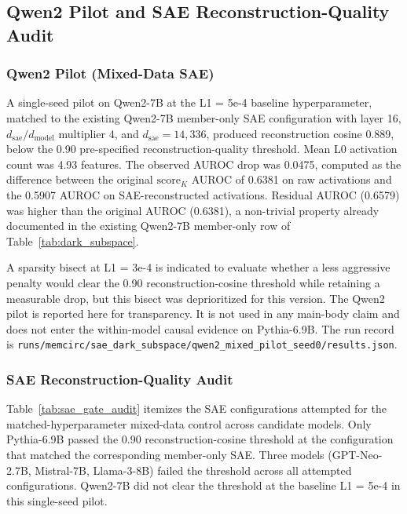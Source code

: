 \FloatBarrier

\subsection{Qwen2 Pilot and SAE Reconstruction-Quality Audit}
\label{app:qwen2_pilot}

\subsubsection{Qwen2 Pilot (Mixed-Data SAE)}

A single-seed pilot on Qwen2-7B at the L1 = 5e-4 baseline hyperparameter, matched to the existing Qwen2-7B member-only SAE configuration with layer 16, $d_{\text{sae}}/d_{\text{model}}$ multiplier 4, and $d_{\text{sae}} = 14{,}336$, produced reconstruction cosine 0.889, below the 0.90 pre-specified reconstruction-quality threshold.
Mean L0 activation count was 4.93 features.
The observed AUROC drop was 0.0475, computed as the difference between the original $\mathrm{score}_K$ AUROC of 0.6381 on raw activations and the 0.5907 AUROC on SAE-reconstructed activations.
Residual AUROC (0.6579) was higher than the original AUROC (0.6381), a non-trivial property already documented in the existing Qwen2-7B member-only row of Table~\ref{tab:dark_subspace}.

A sparsity bisect at L1 = 3e-4 is indicated to evaluate whether a less aggressive penalty would clear the 0.90 reconstruction-cosine threshold while retaining a measurable drop, but this bisect was deprioritized for this version.
The Qwen2 pilot is reported here for transparency. It is not used in any main-body claim and does not enter the within-model causal evidence on Pythia-6.9B.
The run record is \texttt{runs/\allowbreak{}memcirc/\allowbreak{}sae\_\allowbreak{}dark\_\allowbreak{}subspace/\allowbreak{}qwen2\_\allowbreak{}mixed\_\allowbreak{}pilot\_\allowbreak{}seed0/\allowbreak{}results.json}.

\subsubsection{SAE Reconstruction-Quality Audit}

Table~\ref{tab:sae_gate_audit} itemizes the SAE configurations attempted for the matched-hyperparameter mixed-data control across candidate models.
Only Pythia-6.9B passed the 0.90 reconstruction-cosine threshold at the configuration that matched the corresponding member-only SAE.
Three models (GPT-Neo-2.7B, Mistral-7B, Llama-3-8B) failed the threshold across all attempted configurations.
Qwen2-7B did not clear the threshold at the baseline L1 = 5e-4 in this single-seed pilot.

